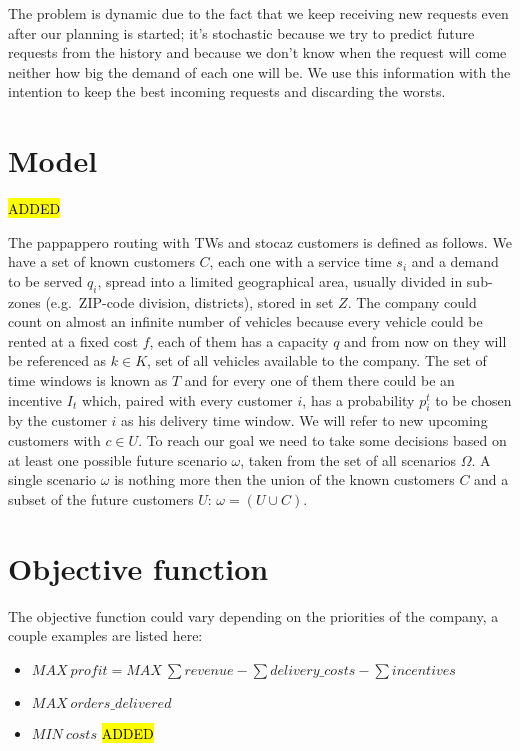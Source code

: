 \documentclass[10pt, letterpaper]{article}
\newcommand{\hlc}[2]{\sethlcolor{#1} \hl{#2}}
\newcommand{\news}[1]{\hlc{green}{#1}}
\begin{document}
The problem is dynamic due to the fact that we keep receiving new requests even 
after our planning is started; it's stochastic because we try to predict future 
requests from the history and because we don't know when the request will come 
neither how big the demand of each one will be.
We use this information with the intention to keep the best incoming requests 
and discarding the worsts.

\section{Model}
\news{ADDED}

The pappappero routing with TWs and stocaz customers is defined as follows.
We have a set of known customers $C$, each one with a service time $s_{i}$ and 
a demand to be served $q_{i}$, spread into a limited geographical area, 
usually divided in sub-zones (e.g.\ ZIP-code division, districts), stored in set
$Z$. The company could count on almost an infinite number of vehicles because 
every vehicle could be rented at a fixed cost $f$, each of them has a capacity 
$q$ and from now on they will be referenced as $k \in K$, set of all vehicles 
available to the company. The set of time windows is known as $T$ and for every 
one of them there could be an incentive $I_{t}$ which, paired with every 
customer $i$, has a probability $p^{t}_{i}$ to be chosen by the customer $i$ as 
his delivery time window. We will refer to new upcoming customers with $c \in U$.
To reach our goal we need to take some decisions based on at least one possible 
future scenario $\omega$, taken from the set of all scenarios $\Omega$.
A single scenario $\omega$ is nothing more then the union of the known 
customers $C$ and a subset of the future customers $U$: 
\( \omega = ( U \cup C ) \).


\section{Objective function}
The objective function could vary depending on the priorities of the company,
a couple examples are listed here:
\begin{itemize}
	\item \( MAX\ profit = MAX\ \sum revenue -
								\sum delivery\_costs -
								\sum incentives \)

	\item \( MAX\ orders\_delivered \)

	\item \( MIN\ costs \) \news{ADDED}
\end{itemize}
\end{document}
